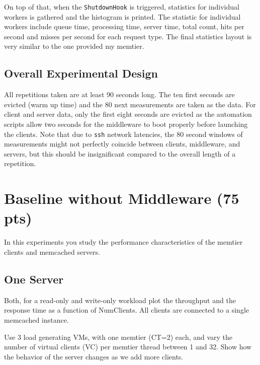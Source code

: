\documentclass[11pt,a4paper]{article}
\begin{document}
On top of that, when the \texttt{ShutdownHook} is triggered, statistics for individual workers is gathered and the histogram is printed. The statistic for individual workers include queue time, processing time, server time, total count, hits per second and misses per second for each request type. The final statistics layout is very similar to the one provided my memtier.


\subsection{Overall Experimental Design}
All repetitions taken are at least 90 seconds long. The ten first seconds are evicted (warm up time) and the 80 next measurements are taken as the data. For client and server data, only the first eight seconds are evicted as the automation scripts allow two seconds for the middleware to boot properly before launching the clients. Note that due to \texttt{ssh} network latencies, the 80 second windows of measurements might not perfectly coincide between clients, middleware, and servers, but this should be insignificant compared to the overall length of a repetition.




\newpage

\section{Baseline without Middleware (75 pts)}

In this experiments you study the performance characteristics of the memtier clients and memcached servers.

\subsection{One Server}

Both, for a read-only and write-only workload plot the throughput and the response time as a function of NumClients. All clients are connected to a single memcached instance.

Use 3 load generating VMs, with one memtier (CT=2) each, and vary the number of virtual clients (VC) per memtier thread between 1 and 32. Show how the behavior of the server changes as we add more clients.
\end{document}
